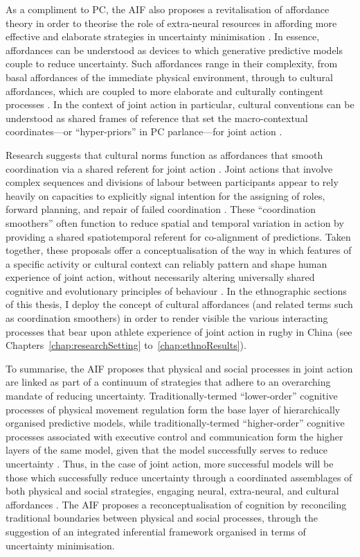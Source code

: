 \begin{CJK}{UTF8}{gbsn}
As a compliment to PC, the AIF also proposes a revitalisation of affordance theory \citep{Gibson1979} in order to theorise the role of extra-neural resources in affording more effective and elaborate strategies in uncertainty minimisation \citep{Friston2012}.  In essence, affordances can be understood as devices to which generative predictive models couple to reduce uncertainty.  Such affordances range in their complexity, from basal affordances of the immediate physical environment, through to cultural affordances, which are coupled to more elaborate and culturally contingent processes \citep{Ramstead2016}.  In the context of joint action in particular, cultural conventions can be understood as shared frames of reference that set the macro-contextual coordinates---or ``hyper-priors'' in PC parlance---for joint action \citep{Clark2013}.

Research suggests that cultural norms function as affordances that smooth coordination via a shared referent for joint action \citep{Vesper2017}. Joint actions that involve complex sequences and divisions of labour between participants appear to rely heavily on capacities to explicitly signal intention for the assigning of roles, forward planning, and repair of failed coordination \citep{Frith2010}.  These ``coordination smoothers'' \citep{Vesper2017} often function to reduce spatial and temporal variation in action by providing a shared spatiotemporal referent for co-alignment of predictions. Taken together, these proposals offer a conceptualisation of the way in which features of a specific activity or cultural context can reliably pattern and shape human experience of joint action, without necessarily altering universally shared cognitive and evolutionary principles of behaviour \citep{Roepstorff2010}. In the ethnographic sections of this thesis, I deploy the concept of cultural affordances (and related terms such as coordination smoothers) in order to render visible the various interacting processes that bear upon athlete experience of joint action in rugby in China (see Chapters~\ref{chap:researchSetting} to~\ref{chap:ethnoResults}).

To summarise, the AIF proposes that physical and social processes in joint action are linked as part of a continuum of strategies that adhere to an overarching mandate of reducing uncertainty.  Traditionally-termed ``lower-order'' cognitive processes of physical movement regulation form the base layer of hierarchically organised predictive models, while traditionally-termed ``higher-order'' cognitive processes associated with executive control and communication form the higher layers of the same model, given that the model successfully serves to reduce uncertainty \citep[over the lifespan of the organism][]{Ramstead2017}.  Thus, in the case of joint action, more successful models will be those which successfully reduce uncertainty through a coordinated assemblages of both physical and social strategies, engaging neural, extra-neural, and cultural affordances \citep{Clark2015}.  The AIF proposes a reconceptualisation of cognition by reconciling traditional boundaries between physical and social processes, through the suggestion of an integrated inferential framework organised in terms of uncertainty minimisation.


\end{CJK}
